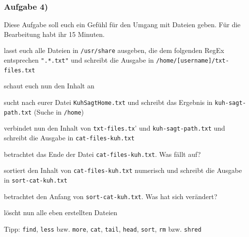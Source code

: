\documentclass[12pt,utf8]{beamer}
\begin{document}
\begin{frame}
\frametitle{Aufgabe 4)}
Diese Aufgabe soll euch ein Gefühl für den Umgang mit Dateien geben. Für die Bearbeitung habt ihr 15 Minuten.
\begin{itemize}
	{\footnotesize
	\item lasst euch alle Dateien in \texttt{/usr/share} ausgeben, die dem folgenden RegEx entsprechen \texttt{".*.txt"} und schreibt die Ausgabe in \texttt{/home/[username]/txt-files.txt}
	\item schaut euch nun den Inhalt an
	\item sucht nach eurer Datei \texttt{KuhSagtHome.txt} und schreibt das Ergebnis in \texttt{kuh-sagt-path.txt} (Suche in \texttt{/home})
	\item verbindet nun den Inhalt von \texttt{txt-files.tx}' und \texttt{kuh-sagt-path.txt} und schreibt die Ausgabe in \texttt{cat-files-kuh.txt}
	\item betrachtet das Ende der Datei \texttt{cat-files-kuh.txt}. Was fällt auf?
	\item sortiert den Inhalt von \texttt{cat-files-kuh.txt} numerisch und schreibt die Ausgabe in \texttt{sort-cat-kuh.txt}
	\item betrachtet den Anfang von \texttt{sort-cat-kuh.txt}. Was hat sich verändert?
	\item löscht nun alle eben erstellten Dateien
	}
\end{itemize}
{\scriptsize Tipp: \texttt{find}, \texttt{less} bzw. \texttt{more}, \texttt{cat}, \texttt{tail}, \texttt{head}, \texttt{sort}, \texttt{rm} bzw. \texttt{shred}}
\end{frame}
\end{document}
